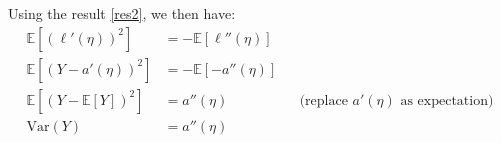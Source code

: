 \begin{answer}
Using the result \eqref{res2}, we then have:
\begin{align}
	\mathbb{E}[(\ell'(\eta))^2] &= - \mathbb{E}[\ell''(\eta)] \\
	\mathbb{E}[(Y - a'(\eta))^2] &= - \mathbb{E}[-a''(\eta)] \\
	\mathbb{E}[(Y - \mathbb{E}[Y])^2] &= a''(\eta) && \text{(replace $a'(\eta)$ as expectation)} \\
	\text{Var}(Y) &= a''(\eta)
\end{align} \\
\end{answer}
